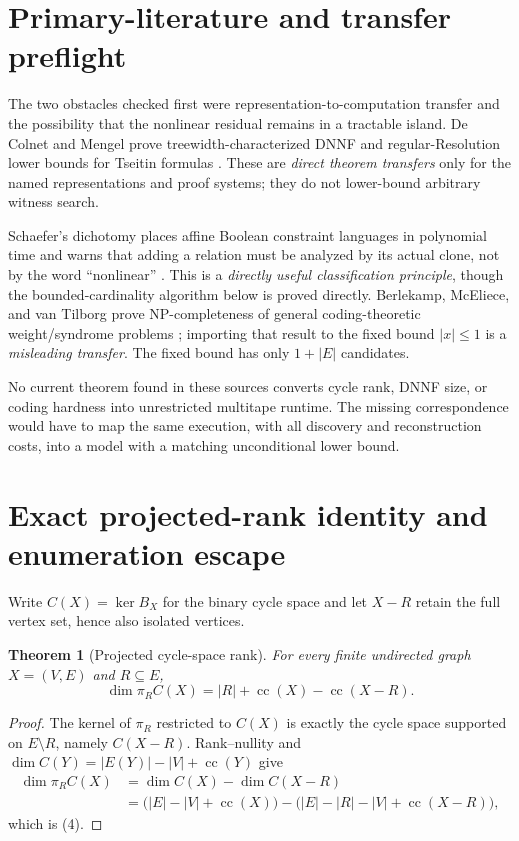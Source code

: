 \documentclass[11pt]{article}
\newtheorem{theorem}{Theorem}
\begin{document}
\section{Primary-literature and transfer preflight}
The two obstacles checked first were representation-to-computation transfer and
the possibility that the nonlinear residual remains in a tractable island.
De Colnet and Mengel prove treewidth-characterized DNNF and regular-Resolution
lower bounds for Tseitin formulas \cite{dCM}.  These are \emph{direct theorem
transfers} only for the named representations and proof systems; they do not
lower-bound arbitrary witness search.

Schaefer's dichotomy places affine Boolean constraint languages in polynomial
time and warns that adding a relation must be analyzed by its actual clone,
not by the word ``nonlinear'' \cite{Schaefer}.  This is a \emph{directly useful
classification principle}, though the bounded-cardinality algorithm below is
proved directly.  Berlekamp, McEliece, and van Tilborg prove NP-completeness of
general coding-theoretic weight/syndrome problems \cite{BMvT}; importing that
result to the fixed bound $|x|\le1$ is a \emph{misleading transfer}.  The fixed
bound has only $1+|E|$ candidates.

No current theorem found in these sources converts cycle rank, DNNF size, or
coding hardness into unrestricted multitape runtime.  The missing
correspondence would have to map the same execution, with all discovery and
reconstruction costs, into a model with a matching unconditional lower bound.

\section{Exact projected-rank identity and enumeration escape}
Write $C(X)=\ker B_X$ for the binary cycle space and let $X-R$ retain the full
vertex set, hence also isolated vertices.

\begin{theorem}[Projected cycle-space rank]
For every finite undirected graph $X=(V,E)$ and $R\subseteq E$,
\[
 \dim\pi_R C(X)=|R|+\operatorname{cc}(X)-\operatorname{cc}(X-R).           \tag{4}
\]
\end{theorem}
\begin{proof}
The kernel of $\pi_R$ restricted to $C(X)$ is exactly the cycle space supported
on $E\setminus R$, namely $C(X-R)$.  Rank--nullity and
$\dim C(Y)=|E(Y)|-|V|+\operatorname{cc}(Y)$ give
\begin{align*}
\dim\pi_R C(X)
 &=\dim C(X)-\dim C(X-R)\\
 &=\bigl(|E|-|V|+\operatorname{cc}(X)\bigr)
   -\bigl(|E|-|R|-|V|+\operatorname{cc}(X-R)\bigr),
\end{align*}
which is (4).
\end{proof}
\end{document}

